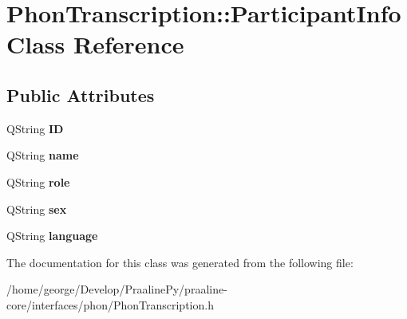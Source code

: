 \hypertarget{class_phon_transcription_1_1_participant_info}{}\section{Phon\+Transcription\+:\+:Participant\+Info Class Reference}
\label{class_phon_transcription_1_1_participant_info}
\subsection*{Public Attributes}
\begin{DoxyCompactItemize}
\item 
\mbox{\label{class_phon_transcription_1_1_participant_info_abd54381a702f932ab37ba234c84a3ffe}} 
Q\+String {\bfseries ID}
\item 
\mbox{\label{class_phon_transcription_1_1_participant_info_aa4357209c6c1f2404311dc94d3097bde}} 
Q\+String {\bfseries name}
\item 
\mbox{\label{class_phon_transcription_1_1_participant_info_a864833cfebe856768f6010a852701ed4}} 
Q\+String {\bfseries role}
\item 
\mbox{\label{class_phon_transcription_1_1_participant_info_a82d9538ac124c6b638af52654c8328d6}} 
Q\+String {\bfseries sex}
\item 
\mbox{\label{class_phon_transcription_1_1_participant_info_a02701b08c3f6d5ca2cb4802673ec065a}} 
Q\+String {\bfseries language}
\end{DoxyCompactItemize}


The documentation for this class was generated from the following file\+:\begin{DoxyCompactItemize}
\item 
/home/george/\+Develop/\+Praaline\+Py/praaline-\/core/interfaces/phon/Phon\+Transcription.\+h\end{DoxyCompactItemize}
